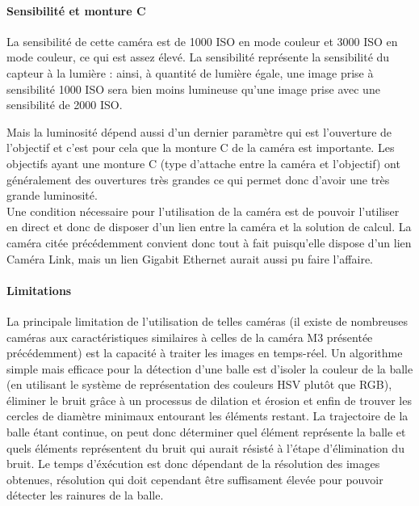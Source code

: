 \paragraph{Sensibilité et monture C\\}

La sensibilité de cette caméra est de 1000 ISO en mode couleur et 3000 ISO en mode couleur, ce qui est assez élevé. La sensibilité représente la sensibilité du capteur à la lumière : ainsi, à quantité de lumière égale, une image prise à sensibilité 1000 ISO sera bien moins lumineuse qu'une image prise avec une sensibilité de 2000 ISO. 

Mais la luminosité dépend aussi d'un dernier paramètre qui est l'ouverture de l'objectif et c'est pour cela que la monture C de la caméra est importante. Les objectifs ayant une monture C (type d'attache entre la caméra et l'objectif) ont généralement des ouvertures très grandes ce qui permet donc d'avoir une très grande luminosité. \\


Une condition nécessaire pour l'utilisation de la caméra est de pouvoir l'utiliser en direct et donc de disposer d'un lien entre la caméra et la solution de calcul. La caméra citée précédemment convient donc tout à fait puisqu'elle dispose d'un lien Caméra Link, mais un lien Gigabit Ethernet aurait aussi pu faire l'affaire.

\paragraph{Limitations\\}

La principale limitation de l'utilisation de telles caméras (il existe de nombreuses caméras aux caractéristiques similaires à celles de la caméra M3 présentée précédemment) est la capacité à traiter les images en temps-réel. Un algorithme simple mais efficace pour la détection d'une balle est d'isoler la couleur de la balle (en utilisant le système de représentation des couleurs HSV plutôt que RGB), éliminer le bruit grâce à un processus de dilation et érosion et enfin de trouver les cercles de diamètre minimaux entourant les éléments restant. La trajectoire de la balle étant continue, on peut donc déterminer quel élément représente la balle et quels éléments représentent du bruit qui aurait résisté à l'étape d'élimination du bruit. Le temps d'éxécution est donc dépendant de la résolution des images obtenues, résolution qui doit cependant être suffisament élevée pour pouvoir détecter les rainures de la balle. 


